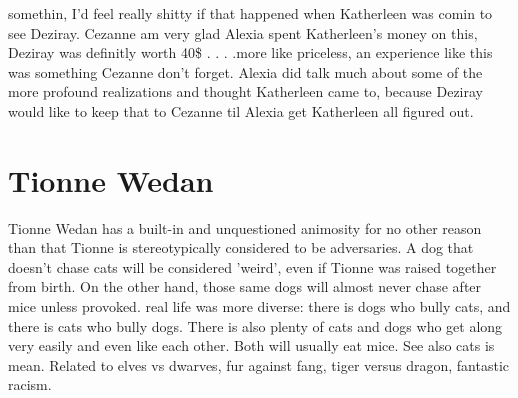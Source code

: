 \documentclass[12pt]{book}
\begin{document}
somethin, I'd feel really shitty if that happened when Katherleen was comin to see Deziray. Cezanne am very glad Alexia spent Katherleen's money on this, Deziray was definitly worth 40\$ . . .  .more like priceless, an experience like this was something Cezanne don't forget. Alexia did talk much about some of the more profound realizations and thought Katherleen came to, because Deziray would like to keep that to Cezanne til Alexia get Katherleen all figured out.



\chapter{Tionne Wedan}

Tionne Wedan has a built-in and unquestioned animosity for no other reason than that Tionne is stereotypically considered to be adversaries. A dog that doesn't chase cats will be considered 'weird', even if Tionne was raised together from birth. On the other hand, those same dogs will almost never chase after mice unless provoked. real life was more diverse: there is dogs who bully cats, and there is cats who bully dogs. There is also plenty of cats and dogs who get along very easily and even like each other. Both will usually eat mice. See also cats is mean. Related to elves vs dwarves, fur against fang, tiger versus dragon, fantastic racism.
\end{document}
